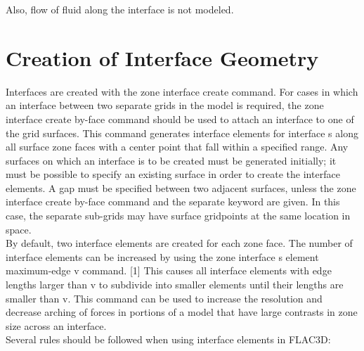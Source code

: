 \documentclass[a4paper, nobind]{templates/ociamthesis}
\begin{document}
Also, flow of fluid along the interface is not modeled.\\

\hypertarget{creation-of-interface-geometry}{%
\section{Creation of Interface Geometry}\label{creation-of-interface-geometry}}

Interfaces are created with the zone interface create command. For cases
in which an interface between two separate grids in the model is
required, the zone interface create by-face command should be used to
attach an interface to one of the grid surfaces. This command generates
interface elements for interface s along all surface zone faces with a
center point that fall within a specified range. Any surfaces on which
an interface is to be created must be generated initially; it must be
possible to specify an existing surface in order to create the interface
elements. A gap must be specified between two adjacent surfaces, unless
the zone interface create by-face command and the separate keyword are
given. In this case, the separate sub-grids may have surface gridpoints
at the same location in space.\\

By default, two interface elements are created for each zone face. The
number of interface elements can be increased by using the zone
interface s element maximum-edge v command. {[}1{]} This causes all
interface elements with edge lengths larger than v to subdivide into
smaller elements until their lengths are smaller than v. This command
can be used to increase the resolution and decrease arching of forces in
portions of a model that have large contrasts in zone size across an
interface.\\

Several rules should be followed when using interface elements in
FLAC3D:\\
\end{document}
